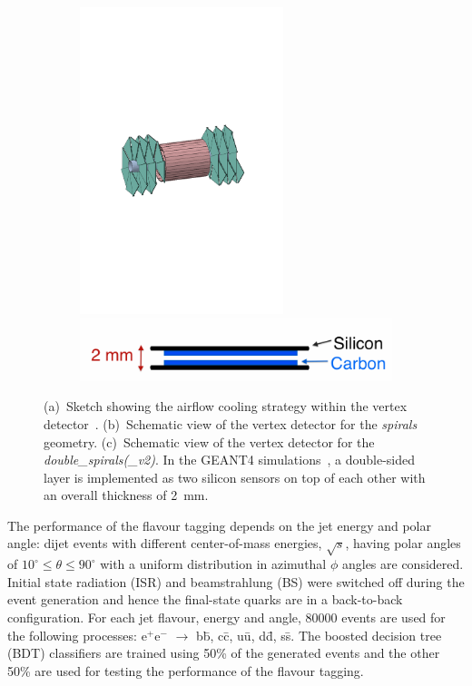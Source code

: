 \begin{figure}[htbp]
\begin{subfigure}[b]{0.25\textwidth}
    \includegraphics[trim = 32mm 98mm 85mm 106mm, clip, width=0.65\textwidth]{figures/CLIC/double_spiral.pdf} \\
    \includegraphics[width=1.5\textwidth]{figures/CLIC/double_layer_module.png} 
    \caption{}
    \label{fig:doubleLayer}
  \end{subfigure}
  \caption{(a)~Sketch showing the airflow cooling strategy within the
    vertex detector~\cite{DuarteRamos:1572989}. (b)~Schematic view of
    the vertex detector for the \emph{spirals} geometry. (c)~Schematic
    view of the vertex detector for the
    \emph{double\_spirals(\_v2)}. In the \textsc{GEANT4}
    simulations~\cite{Agostinelli:2002hh}, a double-sided layer is
    implemented as two silicon sensors on top of each other with an
    overall thickness of \SI{2}{\milli\meter}.}
  \label{fig:geometries}
\end{figure}

The performance of the flavour tagging depends on the jet energy and
polar angle: dijet events with different center-of-mass energies,
$\sqrt{s}$, having polar angles of
$10^{\circ} \leq \theta \leq 90^{\circ}$ with a uniform distribution
in azimuthal $\phi$ angles are considered. Initial state radiation
(ISR) and beamstrahlung (BS) were switched off during the event
generation and hence the final-state quarks are in a back-to-back
configuration. For each jet flavour, energy and angle, 80000 events
are used for the following processes: e$^+$e$^-$ $\rightarrow$ b\={b},
c\={c}, u\={u}, d\={d}, s\={s}. The boosted decision tree (BDT)
classifiers are trained using 50\% of the generated events and the
other 50\% are used for testing the performance of the flavour
tagging.

